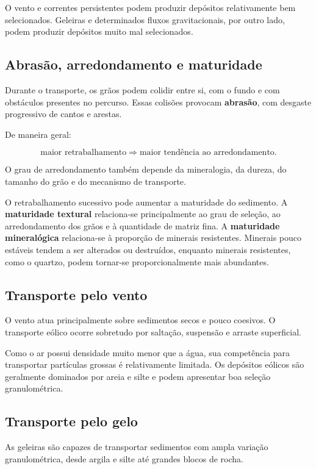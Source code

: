 O vento e correntes persistentes podem produzir depósitos relativamente bem
selecionados. Geleiras e determinados fluxos gravitacionais, por outro lado,
podem produzir depósitos muito mal selecionados.

\subsection{Abrasão, arredondamento e maturidade}

Durante o transporte, os grãos podem colidir entre si, com o fundo e com
obstáculos presentes no percurso. Essas colisões provocam \textbf{abrasão}, com
desgaste progressivo de cantos e arestas.

De maneira geral:

\[
\text{maior retrabalhamento}
\Rightarrow
\text{maior tendência ao arredondamento}.
\]

O grau de arredondamento também depende da mineralogia, da dureza, do tamanho do
grão e do mecanismo de transporte.

O retrabalhamento sucessivo pode aumentar a maturidade do sedimento. A
\textbf{maturidade textural} relaciona-se principalmente ao grau de seleção, ao
arredondamento dos grãos e à quantidade de matriz fina. A
\textbf{maturidade mineralógica} relaciona-se à proporção de minerais
resistentes. Minerais pouco estáveis tendem a ser alterados ou destruídos,
enquanto minerais resistentes, como o quartzo, podem tornar-se
proporcionalmente mais abundantes.

\subsection{Transporte pelo vento}

O vento atua principalmente sobre sedimentos secos e pouco coesivos. O
transporte eólico ocorre sobretudo por saltação, suspensão e arraste superficial.

Como o ar possui densidade muito menor que a água, sua competência para
transportar partículas grossas é relativamente limitada. Os depósitos eólicos
são geralmente dominados por areia e silte e podem apresentar boa seleção
granulométrica.

\subsection{Transporte pelo gelo}

As geleiras são capazes de transportar sedimentos com ampla variação
granulométrica, desde argila e silte até grandes blocos de rocha.


